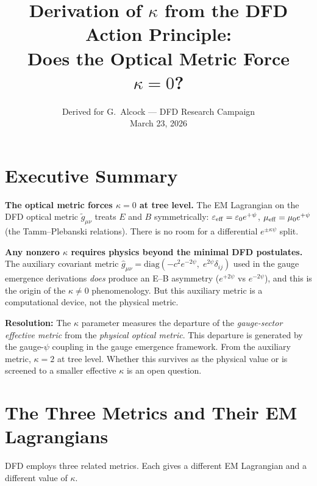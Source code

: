 \documentclass[11pt,a4paper]{article}
\title{Derivation of $\kappa$ from the DFD Action Principle:\\
Does the Optical Metric Force $\kappa = 0$?}
\author{Derived for G.\ Alcock --- DFD Research Campaign\\
March 23, 2026}
\date{}
\theoremstyle{definition}
\theoremstyle{remark}
\begin{document}
\maketitle

\section{Executive Summary}

\begin{tcolorbox}[colback=red!5!white, colframe=red!60!black, title=Principal Finding]
\textbf{The optical metric forces $\kappa = 0$ at tree level.}
The EM Lagrangian on the DFD optical metric $\tilde{g}_{\mu\nu}$ treats
$E$ and $B$ symmetrically: $\varepsilon_{\rm eff} = \varepsilon_0 e^{+\psi}$,
$\mu_{\rm eff} = \mu_0 e^{+\psi}$ (the Tamm--Plebanski relations).  There
is no room for a differential $e^{\pm\kappa\psi}$ split.

\medskip
\textbf{Any nonzero $\kappa$ requires physics beyond the minimal DFD
postulates.}  The auxiliary covariant metric
$\hat{g}_{\mu\nu} = \mathrm{diag}(-c^2 e^{-2\psi},\; e^{2\psi}\delta_{ij})$
used in the gauge emergence derivations \textit{does} produce an E--B
asymmetry ($e^{+2\psi}$ vs $e^{-2\psi}$), and this is the origin of the
$\kappa \neq 0$ phenomenology.  But this auxiliary metric is a computational
device, not the physical metric.

\medskip
\textbf{Resolution:}  The $\kappa$ parameter measures the departure of the
\textit{gauge-sector effective metric} from the \textit{physical optical metric}.
This departure is generated by the gauge-$\psi$ coupling in the gauge emergence
framework.  From the auxiliary metric, $\kappa = 2$ at tree level.  Whether
this survives as the physical value or is screened to a smaller effective $\kappa$
is an open question.
\end{tcolorbox}

\section{The Three Metrics and Their EM Lagrangians}

DFD employs three related metrics.  Each gives a different EM Lagrangian
and a different value of $\kappa$.
\end{document}
